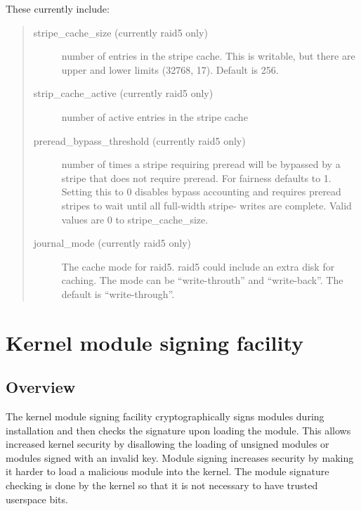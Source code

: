 \documentclass[a4paper,8pt,english]{sphinxmanual}
\begin{document}
These currently include:
\begin{quote}
\begin{description}
\item[{stripe\_cache\_size  (currently raid5 only)}] \leavevmode
number of entries in the stripe cache.  This is writable, but
there are upper and lower limits (32768, 17).  Default is 256.

\item[{strip\_cache\_active (currently raid5 only)}] \leavevmode
number of active entries in the stripe cache

\item[{preread\_bypass\_threshold (currently raid5 only)}] \leavevmode
number of times a stripe requiring preread will be bypassed by
a stripe that does not require preread.  For fairness defaults
to 1.  Setting this to 0 disables bypass accounting and
requires preread stripes to wait until all full-width stripe-
writes are complete.  Valid values are 0 to stripe\_cache\_size.

\item[{journal\_mode (currently raid5 only)}] \leavevmode
The cache mode for raid5. raid5 could include an extra disk for
caching. The mode can be ``write-throuth'' and ``write-back''. The
default is ``write-through''.

\end{description}
\end{quote}


\chapter{Kernel module signing facility}
\label{admin-guide/module-signing:kernel-module-signing-facility}\label{admin-guide/module-signing::doc}

\section{Overview}
\label{admin-guide/module-signing:overview}
The kernel module signing facility cryptographically signs modules during
installation and then checks the signature upon loading the module.  This
allows increased kernel security by disallowing the loading of unsigned modules
or modules signed with an invalid key.  Module signing increases security by
making it harder to load a malicious module into the kernel.  The module
signature checking is done by the kernel so that it is not necessary to have
trusted userspace bits.
\end{document}
